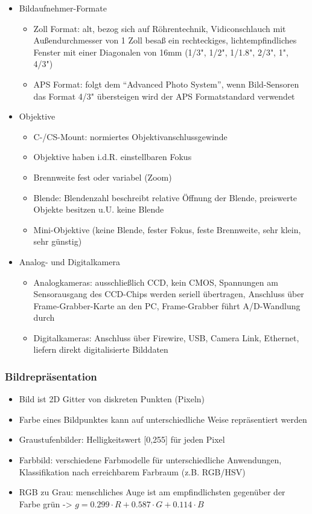 \documentclass[paper=a4, fontsize=11pt]{scrartcl} %
\numberwithin{equation}{section} %
\numberwithin{figure}{section} %
\numberwithin{table}{section} %
\begin{document}
\begin{itemize}
\item Bildaufnehmer-Formate
\begin{itemize}
\item Zoll Format: alt, bezog sich auf Röhrentechnik, Vidiconschlauch mit Außendurchmesser von 1 Zoll besaß ein rechteckiges, lichtempfindliches Fenster mit einer Diagonalen von 16mm (1/3", 1/2", 1/1.8", 2/3", 1", 4/3")
\item APS Format: folgt dem ``Advanced Photo System'', wenn Bild-Sensoren das Format 4/3" übersteigen wird der APS Formatstandard verwendet
\end{itemize}
\item Objektive
\begin{itemize}
\item C-/CS-Mount: normiertes Objektivanschlussgewinde
\item Objektive haben i.d.R. einstellbaren Fokus
\item Brennweite fest oder variabel (Zoom)
\item Blende: Blendenzahl beschreibt relative Öffnung der Blende, preiswerte Objekte besitzen u.U. keine Blende
\item Mini-Objektive (keine Blende, fester Fokus, feste Brennweite, sehr klein, sehr günstig)
\end{itemize}
\item Analog- und Digitalkamera
\begin{itemize}
\item Analogkameras: ausschließlich CCD, kein CMOS, Spannungen am Sensorausgang des CCD-Chips werden seriell übertragen, Anschluss über Frame-Grabber-Karte an den PC, Frame-Grabber führt A/D-Wandlung durch
\item Digitalkameras: Anschluss über Firewire, USB, Camera Link, Ethernet, liefern direkt digitalisierte Bilddaten
\end{itemize}
\end{itemize}

\subsubsection{Bildrepräsentation}

\begin{itemize}
\item Bild ist 2D Gitter von diskreten Punkten (Pixeln)
\item Farbe eines Bildpunktes kann auf unterschiedliche Weise repräsentiert werden
\item Graustufenbilder: Helligkeitswert [0,255] für jeden Pixel
\item Farbbild: verschiedene Farbmodelle für unterschiedliche Anwendungen, Klassifikation nach erreichbarem Farbraum (z.B. RGB/HSV)
\item RGB zu Grau: menschliches Auge ist am empfindlichsten gegenüber der Farbe grün -> $g = 0.299 \cdot R + 0.587 \cdot G + 0.114 \cdot B$
\end{itemize}
\end{document}
